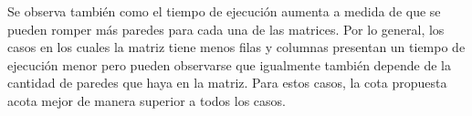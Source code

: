   Se observa también como el tiempo de ejecución aumenta a medida de que se pueden romper más paredes para cada una de las matrices. Por lo general, los casos en los cuales la matriz tiene menos filas y columnas presentan un tiempo de ejecución menor pero pueden observarse que igualmente también depende de la cantidad de paredes que haya en la matriz. Para estos casos, la cota propuesta acota mejor de manera superior a todos los casos.

